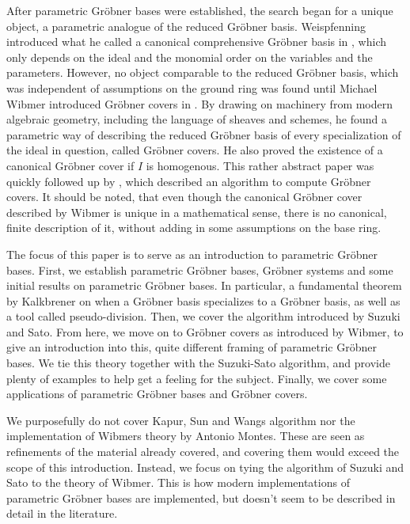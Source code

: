 After parametric Gröbner bases were established, the search began for a unique object, a parametric analogue of the reduced Gröbner basis. Weispfenning introduced what he called a canonical comprehensive Gröbner basis in \cite{WEISPFENNING2003669}, which only depends on the ideal and the monomial order on the variables and the parameters. However, no object comparable to the reduced Gröbner basis, which was independent of assumptions on the ground ring was found until Michael Wibmer introduced Gröbner covers in \cite{grb_covers}. By drawing on machinery from modern algebraic geometry, including the language of sheaves and schemes, he found a parametric way of describing the reduced Gröbner basis of every specialization of the ideal in question, called Gröbner covers. He also proved the existence of a canonical Gröbner cover if $I$ is homogenous. This rather abstract paper was quickly followed up by \cite{MONTES20101391}, which described an algorithm to compute Gröbner covers. It should be noted, that even though the canonical Gröbner cover described by Wibmer is unique in a mathematical sense, there is no canonical, finite description of it, without adding in some assumptions on the base ring.

The focus of this paper is to serve as an introduction to parametric Gröbner bases. First, we establish parametric Gröbner bases, Gröbner systems and some initial results on parametric Gröbner bases. In particular, a fundamental theorem by Kalkbrener\cite{Kalkbrener} on when a Gröbner basis specializes to a Gröbner basis, as well as a tool called pseudo-division. Then, we cover the algorithm introduced by Suzuki and Sato. From here, we move on to Gröbner covers as introduced by Wibmer, to give an introduction into this, quite different framing of parametric Gröbner bases. We tie this theory together with the Suzuki-Sato algorithm, and provide plenty of examples to help get a feeling for the subject. Finally, we cover some applications of parametric Gröbner bases and Gröbner covers.

We purposefully do not cover Kapur, Sun and Wangs algorithm nor the implementation of Wibmers theory by Antonio Montes\cite{MONTES20101391}. These are seen as refinements of the material already covered, and covering them would exceed the scope of this introduction. Instead, we focus on tying the algorithm of Suzuki and Sato to the theory of Wibmer. This is how modern implementations of parametric Gröbner bases are implemented, but doesn't seem to be described in detail in the literature.

